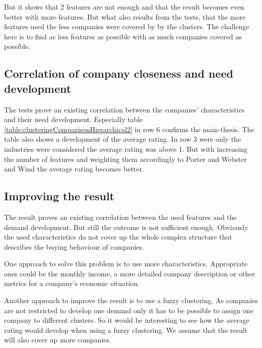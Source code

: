 But it shows that 2 features are not enough and that the result becomes even better with more features. But what also
results from the tests, that the more features used the less companies were covered by by the clusters. The challenge
here is to find as less features as possible with as much companies covered as possible.

\subsection{Correlation of company closeness and need development}
The tests prove an existing correlation between the companies' characteristics and their need development.
Especially table \ref{table:clusteringComparisonHierarchical2} in row 6 confirms the main-thesis.
The table also shows a development of the average rating. In row 3 were only the industries were considered the average
rating was above 1. But with increasing the number of features and weighting them accordingly to Porter\cite{CompanyClusters} and Webster and Wind\cite{BusinessBuyingBehavior}
the average rating becomes better.

\subsection{Improving the result}
\label{section:improvingResult}
The result proves an existing correlation between the used features and the demand development. But still
the outcome is not sufficient enough. Obviously the used characteristics do not cover up the whole complex
structure that describes the buying behaviour of companies.

One approach to solve this problem is to use more characteristics. Appropriate ones could be the monthly income,
a more detailed company description or other metrics for a company's economic situation.

Another approach to improve the result is to use a fuzzy clustering. As companies are not restricted to develop one demand
only it has to be possible to assign one company to different clusters. So it would be interesting to see how the average rating
would develop when using a fuzzy clustering. We assume that the result will also cover up more companies.
